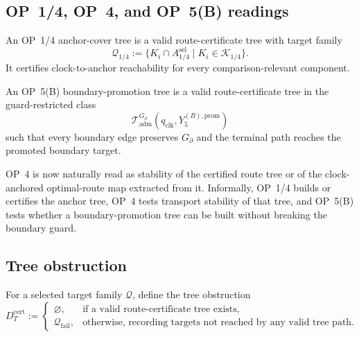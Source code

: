 \subsection{OP~1/4, OP~4, and OP~5(B) readings}
\label{subsec:v410r12-op-readings}

\begin{definition}
\label{def:v410r12-op14-anchor-cover-tree}
An OP~1/4 anchor-cover tree is a valid route-certificate tree with target
family
\[
 \mathcal Q_{1/4}
 :=
 \{K_i\cap A_{1/4}^{\mathrm{sel}}\mid K_i\in\mathcal K_{1/4}\}.
\]
It certifies clock-to-anchor reachability for every comparison-relevant
component.
\end{definition}

\begin{definition}
\label{def:v410r12-op5b-boundary-promotion-tree}
An OP~5(B) boundary-promotion tree is a valid route-certificate tree in the
guard-restricted class
\[
 \mathcal T_{\mathrm{adm}}^{G_{\partial}}
 (q_{\mathrm{clk}},Y_5^{(B),\mathrm{prom}})
\]
such that every boundary edge preserves \(G_{\partial}\) and the terminal path
reaches the promoted boundary target.
\end{definition}

\begin{remark}
\label{rem:v410r12-op4-as-tree-stability}
OP~4 is now naturally read as stability of the certified route tree or of the
clock-anchored optimal-route map extracted from it. Informally, OP~1/4 builds
or certifies the anchor tree, OP~4 tests transport stability of that tree, and
OP~5(B) tests whether a boundary-promotion tree can be built without breaking
the boundary guard.
\end{remark}

\subsection{Tree obstruction}
\label{subsec:v410r12-tree-obstruction}

\begin{definition}
\label{def:v410r12-tree-obstruction}
For a selected target family \(\mathcal Q\), define the tree obstruction
\[
 D_T^{\mathrm{cert}}
 :=
 \begin{cases}
 \varnothing, & \text{if a valid route-certificate tree exists},\\
 \mathcal Q_{\mathrm{fail}}, & \text{otherwise, recording targets not reached
 by any valid tree path.}
 \end{cases}
\]
\end{definition}

